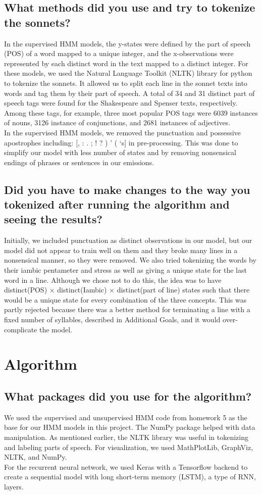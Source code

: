 \subsection{What methods did you use and try to tokenize the sonnets?}
In the supervised HMM models, the y-states were defined by the part of speech (POS) of a word mapped to a unique integer, and the x-observations were represented by each distinct word in the text mapped to a distinct integer. For these models, we used the Natural Language Toolkit (NLTK) library for python to tokenize the sonnets. It allowed us to split each line in the sonnet texts into words and tag them by their part of speech. A total of 34 and 31 distinct part of speech tags were found for the Shakespeare and Spenser texts, respectively. Among these tags, for example, three most popular POS tags were 6039 instances of nouns, 3126 instance of conjunctions, and 2681 instances of adjectives.\\
\indent In the supervised HMM models, we removed the punctuation and possessive apostrophes including: [, : . ; ! ? ) ' ( `s] in pre-processing. This was done to simplify our model with less number of states and by removing nonsensical endings of phrases or sentences in our emissions.
\subsection{Did you have to make changes to the way you tokenized after running the algorithm and seeing the results?}
Initially, we included punctuation as distinct observations in our model, but our model did not appear to train well on them and they broke many lines in a nonsensical manner, so they were removed. We also tried tokenizing the words  by their iambic pentameter and stress as well as giving a unique state for the last word in a line. Although we chose not to do this, the idea was to have distinct(POS) $\times$ distinct(Iambic) $\times$ distinct(part of line) states such that there would be a unique state for every combination of the three concepts. This was partly rejected because there was a better method for terminating a line with a fixed number of syllables, described in Additional Goals, and it would over-complicate the model.

\section{Algorithm}
\medskip
\subsection{What packages did you use for the algorithm?}
We used the supervised and unsupervised HMM code from homework 5 as the base for our HMM models in this project. The NumPy package helped with data manipulation. As mentioned earlier, the NLTK library was useful in tokenizing and labeling parts of speech. For visualization, we used MathPlotLib, GraphViz, NLTK, and NumPy. \\
\indent For the recurrent neural network, we used Keras with a Tensorflow backend to create a sequential model with long short-term memory (LSTM), a type of RNN, layers.
